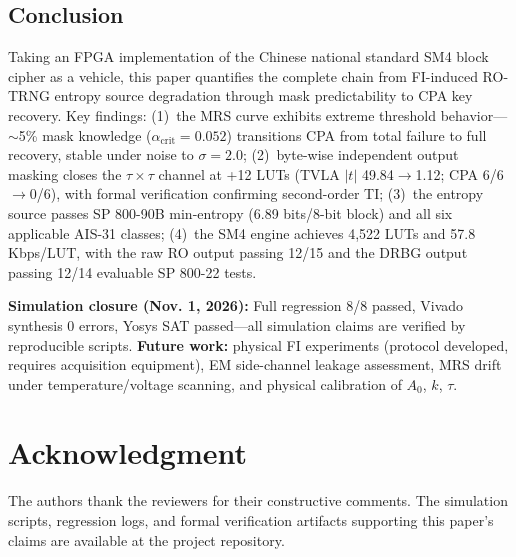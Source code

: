 \documentclass[journal]{IEEEtran}
\begin{document}
\subsection{Conclusion}

Taking an FPGA implementation of the Chinese national standard SM4 block cipher as a vehicle, this paper quantifies the complete chain from FI-induced RO-TRNG entropy source degradation through mask predictability to CPA key recovery. Key findings: (1)~the MRS curve exhibits extreme threshold behavior---$\sim$5\% mask knowledge ($\alpha_{\text{crit}}=0.052$) transitions CPA from total failure to full recovery, stable under noise to $\sigma=2.0$; (2)~byte-wise independent output masking closes the $\tau\times\tau$ channel at +12 LUTs (TVLA $|t|$ 49.84$\rightarrow$1.12; CPA 6/6$\rightarrow$0/6), with formal verification confirming second-order TI; (3)~the entropy source passes SP 800-90B min-entropy (6.89 bits/8-bit block) and all six applicable AIS-31 classes; (4)~the SM4 engine achieves 4,522 LUTs and 57.8 Kbps/LUT, with the raw RO output passing 12/15 and the DRBG output passing 12/14 evaluable SP 800-22 tests.

\textbf{Simulation closure (Nov. 1, 2026):} Full regression 8/8 passed, Vivado synthesis 0 errors, Yosys SAT passed---all simulation claims are verified by reproducible scripts. \textbf{Future work:} physical FI experiments (protocol developed, requires acquisition equipment), EM side-channel leakage assessment, MRS drift under temperature/voltage scanning, and physical calibration of $A_0$, $k$, $\tau$.

\section*{Acknowledgment}

The authors thank the reviewers for their constructive comments. The simulation scripts, regression logs, and formal verification artifacts supporting this paper's claims are available at the project repository.
\end{document}
